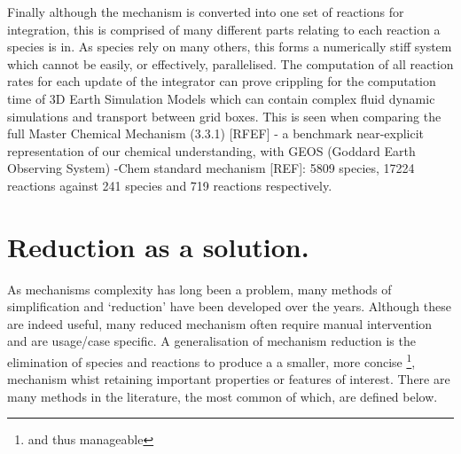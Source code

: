 \documentclass{pasa}%
\begin{document}
Finally although the mechanism is converted into one set of reactions for integration, this is comprised of many different parts relating to each reaction a species is in. As species rely on many others, this forms a numerically stiff system which cannot be easily, or effectively, parallelised. The computation of all reaction rates for each update of the integrator can prove crippling for the computation time of 3D Earth Simulation Models which can contain complex fluid dynamic simulations and transport between grid boxes. This is seen when comparing the full Master Chemical Mechanism (3.3.1) [RFEF] - a benchmark near-explicit representation of our chemical understanding, with GEOS (Goddard Earth Observing System) -Chem  standard mechanism [REF]: 5809 species, 17224 reactions against 241 species and 719 reactions respectively. 
 
 

\section{Reduction as a solution.}

As mechanisms complexity has long been a problem, many methods of simplification and `reduction' have been developed over the years. Although these are indeed useful, many reduced mechanism often require manual intervention and are usage/case specific. A generalisation of mechanism reduction is the elimination of species and reactions to produce a a smaller, more concise \footnote{and thus manageable}, mechanism whist retaining important properties or features of interest. There are many methods in the literature, the most common of which, are defined below. \\


%
%
%
\end{document}

